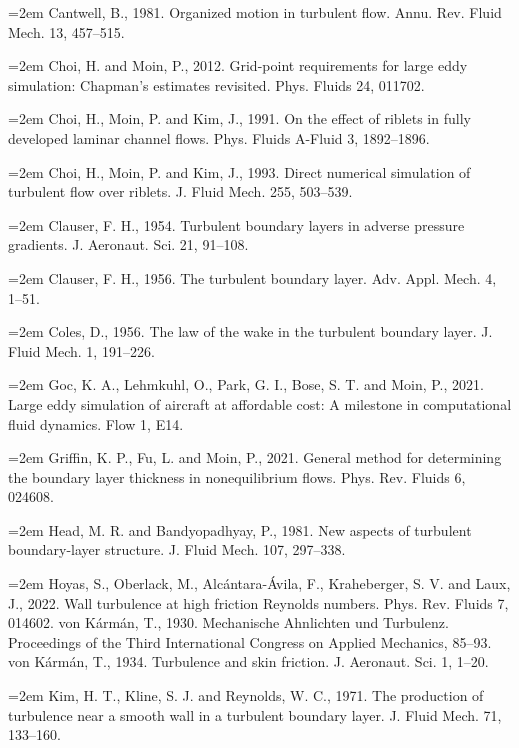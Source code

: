 \documentclass[12pt,a4paper,openany,fontset=none]{ctexbook}
\begin{document}
\par\hangindent=2em Cantwell, B., 1981. Organized motion in turbulent flow. Annu. Rev. Fluid Mech. 13, 457–515.
\par\hangindent=2em Choi, H. and Moin, P., 2012. Grid-point requirements for large eddy simulation: Chapman’s estimates revisited. Phys. Fluids 24, 011702.
\par\hangindent=2em Choi, H., Moin, P. and Kim, J., 1991. On the effect of riblets in fully developed laminar channel flows. Phys. Fluids A-Fluid 3, 1892–1896.
\par\hangindent=2em Choi, H., Moin, P. and Kim, J., 1993. Direct numerical simulation of turbulent flow over riblets. J. Fluid Mech. 255, 503–539.
\par\hangindent=2em Clauser, F. H., 1954. Turbulent boundary layers in adverse pressure gradients. J. Aeronaut. Sci. 21, 91–108.
\par\hangindent=2em Clauser, F. H., 1956. The turbulent boundary layer. Adv. Appl. Mech. 4, 1–51.
\par\hangindent=2em Coles, D., 1956. The law of the wake in the turbulent boundary layer. J. Fluid Mech. 1, 191–226.
\par\hangindent=2em Goc, K. A., Lehmkuhl, O., Park, G. I., Bose, S. T. and Moin, P., 2021. Large eddy simulation of aircraft at affordable cost: A milestone in computational fluid dynamics. Flow 1, E14.
\par\hangindent=2em Griffin, K. P., Fu, L. and Moin, P., 2021. General method for determining the boundary layer thickness in nonequilibrium flows. Phys. Rev. Fluids 6, 024608.
\par\hangindent=2em Head, M. R. and Bandyopadhyay, P., 1981. New aspects of turbulent boundary-layer structure. J. Fluid Mech. 107, 297–338.
\par\hangindent=2em Hoyas, S., Oberlack, M., Alcántara-Ávila, F., Kraheberger, S. V. and Laux, J., 2022. Wall turbulence at high friction Reynolds numbers. Phys. Rev. Fluids 7, 014602. von Kármán, T., 1930. Mechanische Ahnlichten und Turbulenz. Proceedings of the Third International Congress on Applied Mechanics, 85–93. von Kármán, T., 1934. Turbulence and skin friction. J. Aeronaut. Sci. 1, 1–20.
\par\hangindent=2em Kim, H. T., Kline, S. J. and Reynolds, W. C., 1971. The production of turbulence near a smooth wall in a turbulent boundary layer. J. Fluid Mech. 71, 133–160.
\end{document}
